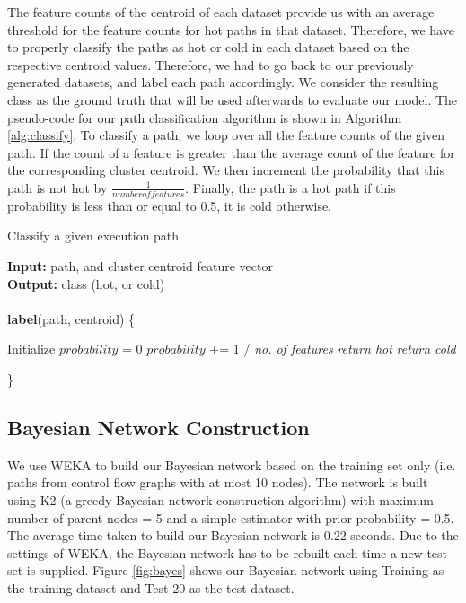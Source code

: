 \documentclass[10pt,twocolumn,letterpaper]{article}
\begin{document}
The feature counts of the centroid of each dataset provide us with an average threshold for the feature counts for hot paths in that dataset. Therefore, we
have to properly classify the paths as hot or cold in each dataset based on the respective centroid values. Therefore, we had to go back to our
previously generated datasets, and label each path accordingly. We consider the resulting class as the ground truth that will be used afterwards to evaluate
our model. The pseudo-code for our path classification algorithm is shown in Algorithm \ref{alg:classify}. To classify a path, we loop over all the
feature counts of the given path. If the count of a feature is greater than the average count of the feature for the corresponding cluster centroid. We then
increment the probability that this path is not hot by $\frac{1}{number of features}$. Finally, the path is a hot path if this probability is less than or equal
to 0.5, it is cold otherwise.

\begin{algorithm}[h!]
\caption{Classify a given execution path}
\label{alg:classify}
\textbf{Input:} {path, and cluster centroid feature vector} \\
\textbf{Output:} {class (hot, or cold)} \\ \\
\textbf{label}(path, centroid) \{
\begin{algorithmic}
   \STATE Initialize $probability$ = 0
     \STATE $probability$ += 1 / \textit{no. of features}
    \ENDIF
   \ENDFOR
    \STATE \textit{return hot}
   \ELSE
    \STATE \textit{return cold}
   \ENDIF
\end{algorithmic}
\}
\end{algorithm}

\subsection{Bayesian Network Construction}
We use WEKA to build our Bayesian network based on the training set only (i.e. paths from control flow graphs with at most 10 nodes). The network is built
using K2 (a greedy Bayesian network construction algorithm) with maximum number of parent nodes = 5 and a simple estimator with prior probability = 0.5. The
average time taken to build our Bayesian network is 0.22 seconds. Due to the settings of WEKA, the Bayesian network has to be rebuilt each time a new test set
is supplied. Figure \ref{fig:bayes} shows our Bayesian network using Training as the training dataset and Test-20 as the test dataset.
\end{document}
